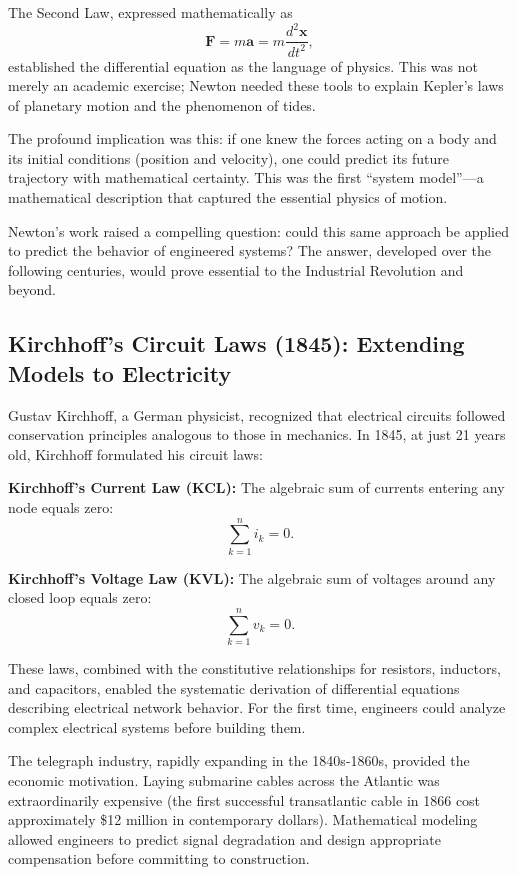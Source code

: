 The Second Law, expressed mathematically as
\begin{equation}
\mathbf{F} = m\mathbf{a} = m\frac{d^2\mathbf{x}}{dt^2},
\label{eq:newton2}
\end{equation}
established the differential equation as the language of physics. This was not merely an academic exercise; Newton needed these tools to explain Kepler's laws of planetary motion and the phenomenon of tides.

The profound implication was this: if one knew the forces acting on a body and its initial conditions (position and velocity), one could predict its future trajectory with mathematical certainty. This was the first ``system model''---a mathematical description that captured the essential physics of motion.

Newton's work raised a compelling question: could this same approach be applied to predict the behavior of engineered systems? The answer, developed over the following centuries, would prove essential to the Industrial Revolution and beyond.

\subsection{Kirchhoff's Circuit Laws (1845): Extending Models to Electricity}

Gustav Kirchhoff, a German physicist, recognized that electrical circuits followed conservation principles analogous to those in mechanics. In 1845, at just 21 years old, Kirchhoff formulated his circuit laws:

\textbf{Kirchhoff's Current Law (KCL):} The algebraic sum of currents entering any node equals zero:
\begin{equation}
\sum_{k=1}^{n} i_k = 0.
\end{equation}

\textbf{Kirchhoff's Voltage Law (KVL):} The algebraic sum of voltages around any closed loop equals zero:
\begin{equation}
\sum_{k=1}^{n} v_k = 0.
\end{equation}

These laws, combined with the constitutive relationships for resistors, inductors, and capacitors, enabled the systematic derivation of differential equations describing electrical network behavior. For the first time, engineers could analyze complex electrical systems before building them.

The telegraph industry, rapidly expanding in the 1840s-1860s, provided the economic motivation. Laying submarine cables across the Atlantic was extraordinarily expensive (the first successful transatlantic cable in 1866 cost approximately \$12 million in contemporary dollars). Mathematical modeling allowed engineers to predict signal degradation and design appropriate compensation before committing to construction.


